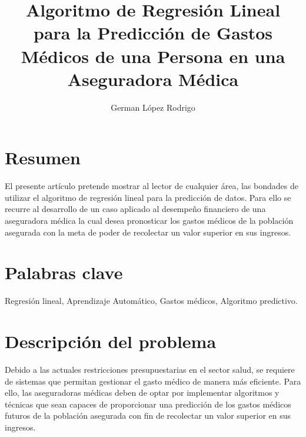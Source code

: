 \documentclass[letterpaper, 10 pt, conference]{ieeeconf}
\title{\LARGE \bf Algoritmo de Regresión Lineal para la Predicción de Gastos Médicos de una Persona en una Aseguradora Médica}
\author{German López Rodrigo\\}
\begin{document}
\maketitle
\thispagestyle{empty}
\pagestyle{empty}

\section{Resumen}

El presente artículo pretende mostrar al lector de cualquier área, las bondades de utilizar el algoritmo de regresión lineal para la predicción de datos. Para ello se recurre al desarrollo de un caso aplicado al desempeño financiero de una aseguradora médica la cual desea pronosticar los gastos médicos de la población asegurada con la meta de poder de recolectar un valor superior en sus ingresos.

\section{Palabras clave}
Regresión lineal, Aprendizaje Automático, Gastos médicos, Algoritmo predictivo.

\section{Descripción del problema}

Debido a las actuales restricciones presupuestarias en el sector salud, se requiere de sistemas que permitan gestionar el gasto médico de manera más eficiente. Para ello, las aseguradoras médicas deben de optar por implementar algoritmos y técnicas que sean capaces de proporcionar una predicción de los gastos médicos futuros de la población asegurada con fin de recolectar un valor superior en sus ingresos.\\
\end{document}
